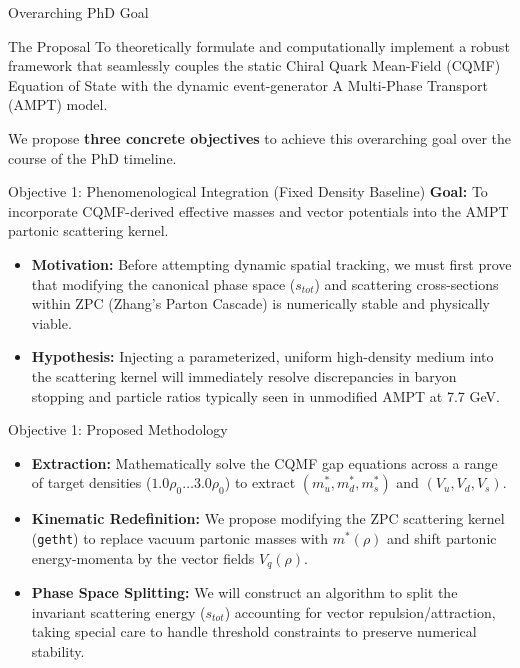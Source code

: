 \documentclass[aspectratio=169]{beamer}
\begin{document}
\begin{frame}{Overarching PhD Goal}
    \begin{block}{The Proposal}
    To theoretically formulate and computationally implement a robust framework that seamlessly couples the static Chiral Quark Mean-Field (CQMF) Equation of State with the dynamic event-generator A Multi-Phase Transport (AMPT) model.
    \end{block}
    
    \vspace{0.5cm}
    We propose \textbf{three concrete objectives} to achieve this overarching goal over the course of the PhD timeline.
\end{frame}

\begin{frame}{Objective 1: Phenomenological Integration (Fixed Density Baseline)}
    \textbf{Goal:} To incorporate CQMF-derived effective masses and vector potentials into the AMPT partonic scattering kernel.
    \vspace{0.3cm}
    \begin{itemize}
        \item \textbf{Motivation:} Before attempting dynamic spatial tracking, we must first prove that modifying the canonical phase space ($s_{tot}$) and scattering cross-sections within ZPC (Zhang's Parton Cascade) is numerically stable and physically viable.
        \item \textbf{Hypothesis:} Injecting a parameterized, uniform high-density medium into the scattering kernel will immediately resolve discrepancies in baryon stopping and particle ratios typically seen in unmodified AMPT at 7.7 GeV.
    \end{itemize}
\end{frame}

\begin{frame}{Objective 1: Proposed Methodology}
    \begin{itemize}
        \item \textbf{Extraction:} Mathematically solve the CQMF gap equations across a range of target densities ($1.0\rho_0 \dots 3.0\rho_0$) to extract $(m_u^*, m_d^*, m_s^*)$ and $(V_u, V_d, V_s)$.
        \item \textbf{Kinematic Redefinition:} We propose modifying the ZPC scattering kernel (\texttt{getht}) to replace vacuum partonic masses with $m^*(\rho)$ and shift partonic energy-momenta by the vector fields $V_q(\rho)$.
        \item \textbf{Phase Space Splitting:} We will construct an algorithm to split the invariant scattering energy ($s_{tot}$) accounting for vector repulsion/attraction, taking special care to handle threshold constraints to preserve numerical stability.
    \end{itemize}
\end{frame}
\end{document}
